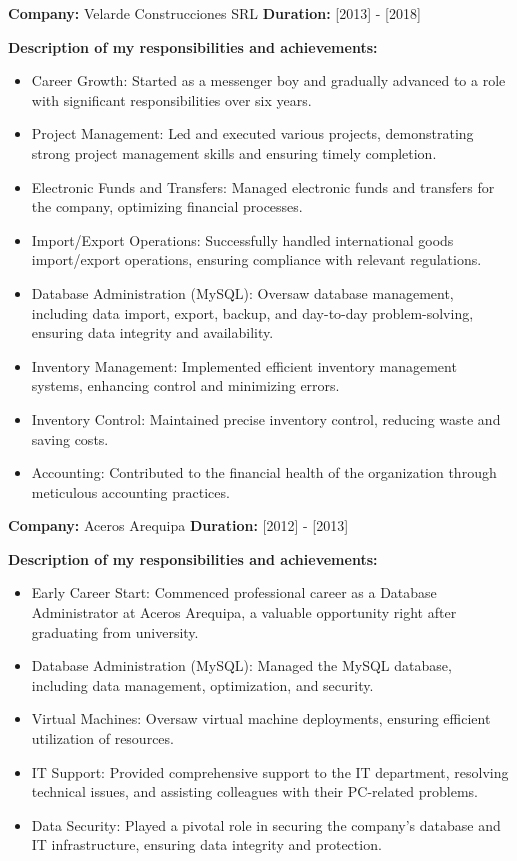 \documentclass[a4paper,10pt]{article}
\begin{document}
\textbf{Company:} Velarde Construcciones SRL  
\textbf{Duration:} [2013] - [2018]

\textbf{Description of my responsibilities and achievements:}
\begin{itemize}
    \item Career Growth: Started as a messenger boy and gradually advanced to a role with significant responsibilities over six years.
    \item Project Management: Led and executed various projects, demonstrating strong project management skills and ensuring timely completion.
    \item Electronic Funds and Transfers: Managed electronic funds and transfers for the company, optimizing financial processes.
    \item Import/Export Operations: Successfully handled international goods import/export operations, ensuring compliance with relevant regulations.
    \item Database Administration (MySQL): Oversaw database management, including data import, export, backup, and day-to-day problem-solving, ensuring data integrity and availability.
    \item Inventory Management: Implemented efficient inventory management systems, enhancing control and minimizing errors.
    \item Inventory Control: Maintained precise inventory control, reducing waste and saving costs.
    \item Accounting: Contributed to the financial health of the organization through meticulous accounting practices.
\end{itemize}
\textbf{Company:} Aceros Arequipa  
\textbf{Duration:} [2012] - [2013]

\textbf{Description of my responsibilities and achievements:}
\begin{itemize}
    \item Early Career Start: Commenced professional career as a Database Administrator at Aceros Arequipa, a valuable opportunity right after graduating from university.
    \item Database Administration (MySQL): Managed the MySQL database, including data management, optimization, and security.
    \item Virtual Machines: Oversaw virtual machine deployments, ensuring efficient utilization of resources.
    \item IT Support: Provided comprehensive support to the IT department, resolving technical issues, and assisting colleagues with their PC-related problems.
    \item Data Security: Played a pivotal role in securing the company's database and IT infrastructure, ensuring data integrity and protection.
\end{itemize}
\end{document}
